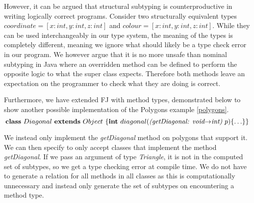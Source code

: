 \documentclass[runningheads]{llncs}
\begin{document}
However, it can be argued that structural subtyping is counterproductive in writing logically correct programs.
Consider two structurally equivalent types $coordinate = [x:int, y:int, z:int]$ and $colour = [x:int, y:int, z:int]$. 
While they can be used interchangeably in our type system, the meaning of the types is completely different, meaning we ignore what should likely be a type check error in our program. 
We however argue that it is no more unsafe than nominal subtyping in Java where an overridden method can be defined to perform the opposite logic to what the super class expects. 
Therefore both methods leave an expectation on the programmer to check what they are doing is correct. 

Furthermore, we have extended FJ with method types, demonstrated below to show another possible implementation of the Polygons example \autoref{polygons}.
$$
\mathbf{class} \  Diagonal \ \mathbf{extends }\  Object\ \{
	\mathbf{int}\ diagonal(\textit{(getDiagonal: void$\rightarrow$int)}  \ p)\{\ldots\}
\}
$$

We instead only implement the \emph{getDiagonal} method on polygons that support it. We can then specify to only accept classes that implement the method \emph{getDiagonal}. If we pass an argument of type \emph{Triangle}, it is not in the computed set of subtypes, so we get a type checking error at compile time.
We do not have to generate a relation for all methods in all classes as this is computationally unnecessary and instead
only generate the set of subtypes on encountering a method type.

\end{document}

